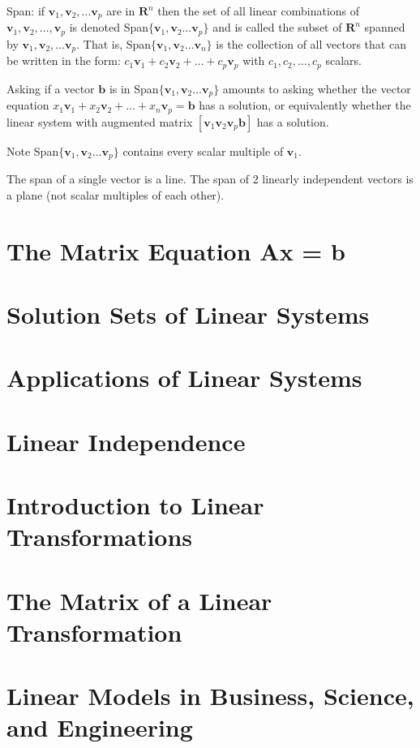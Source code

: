 \documentclass[../linalg.tex]{subfiles}
\begin{document}
Span: if $\textbf{v}_1,\textbf{v}_2,\dots \textbf{v}_p$ are in $\textbf{R}^n$ then the set of all linear combinations of $\textbf{v}_1,\textbf{v}_2,\dots,\textbf{v}_p$ is denoted Span$\{\textbf{v}_1,\textbf{v}_2\dots\textbf{v}_p\}$ and is called the subset of 
$\textbf{R}^n$ spanned by $\textbf{v}_1,\textbf{v}_2,\dots \textbf{v}_p$. That is, Span$\{\textbf{v}_1,\textbf{v}_2\dots\textbf{v}_n\}$ is the collection of all vectors 
that can be written in the form: $c_1\textbf{v}_1+c_2\textbf{v}_2+\dots+c_p\textbf{v}_p$ with $c_1,c_2,\dots,c_p$ scalars.

Asking if a vector $\textbf{b}$ is in Span$\{\textbf{v}_1,\textbf{v}_2\dots\textbf{v}_p\}$ amounts to asking whether the vector equation $x_1\textbf{v}_1+x_2\textbf{v}_2+\dots +x_n\textbf{v}_p=\textbf{b}$ has a solution,
or equivalently whether the linear system with augmented matrix $[\textbf{v}_1 \textbf{v}_2 \textbf{v}_p \textbf{b}]$ has a solution.

Note Span$\{\textbf{v}_1,\textbf{v}_2\dots\textbf{v}_p\}$ contains every scalar multiple of $\textbf{v}_1$. 

The span of a single vector is a line. The span of 2 linearly independent vectors is a plane (not scalar multiples of each other). 

\section{The Matrix Equation Ax = b}
\section{Solution Sets of Linear Systems}
\section{Applications of Linear Systems}
\section{Linear Independence}
\section{Introduction to Linear Transformations}
\section{The Matrix of a Linear Transformation}
\section{Linear Models in Business, Science, and Engineering}
\end{document}

